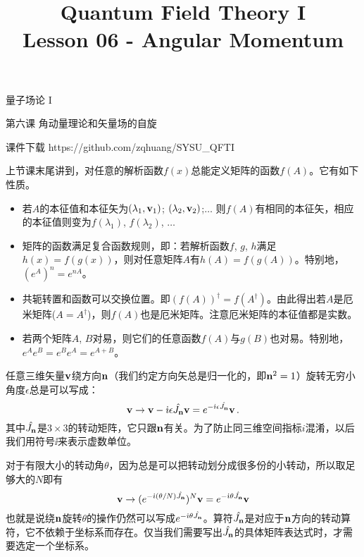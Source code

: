 \documentclass[CJK]{beamer}
\title{Quantum Field Theory I \\ Lesson 06 - Angular Momentum}
\author{}
\date{}
\begin{document}
\begin{frame}
 
\begin{center}
\begin{Large}
\bch
量子场论 I 

{\vskip 0.3in}

第六课 角动量理论和矢量场的自旋

\ech
\end{Large}
\end{center}

\vskip 0.2in

\bch
课件下载
\ech
https://github.com/zqhuang/SYSU\_QFTI

\end{frame}



\begin{frame}
\bch
上节课末尾讲到，对任意的解析函数$f(x)$总能定义矩阵的函数$f(A)$。它有如下性质。
\begin{itemize}
\item{若$A$的本征值和本征矢为$(\lambda_1, {\mathbf{v}}_1)$; $(\lambda_2, {\mathbf{v}}_2)$;$\ldots$ 则$f(A)$有相同的本征矢，相应的本征值则变为$f(\lambda_1)$, $f(\lambda_2)$, $\ldots$}
\item{矩阵的函数满足复合函数规则，即：若解析函数$f$, $g$, $h$满足$h(x) = f(g(x))$，则对任意矩阵$A$有$h(A)=f(g(A))$。特别地，$(e^A)^n = e^{nA}$。}
\item{共轭转置和函数可以交换位置。即$\left(f(A)\right)^\dagger = f(A^\dagger)$。由此得出若$A$是厄米矩阵($A=A^\dagger$)，则$f(A)$也是厄米矩阵。注意厄米矩阵的本征值都是实数。}
\item{若两个矩阵$A$, $B$对易，则它们的任意函数$f(A)$与$g(B)$也对易。特别地，$ e^{A}e^{B} = e^{B}e^{A}=e^{A+B}$。}
\end{itemize}

\ech
\end{frame}

\begin{frame}
\bch
任意三维矢量${\mathbf{v}}$绕方向${\mathbf{n}}$（我们约定方向矢总是归一化的，即${\mathbf{n}}^2=1$）旋转无穷小角度$\epsilon$总是可以写成：
$${\mathbf{v}} \rightarrow {\mathbf{v}} - {\dot{\imath}}\epsilon {\hat{J_{\mathbf{n}}}} {\mathbf{v}} = e^{-{\dot{\imath}}\epsilon{\hat{J_{\mathbf{n}}}}}{\mathbf{v}}\,.$$
其中${\hat{J_{\mathbf{n}}}}$是$3\times 3$的转动矩阵，它只跟${\mathbf{n}}$有关。为了防止同三维空间指标$i$混淆，以后我们用符号$\ii$来表示虚数单位。

对于有限大小的转动角$\theta$，因为总是可以把转动划分成很多份的小转动，所以取足够大的$N$即有
$${\mathbf{v}}\rightarrow (e^{-{\dot{\imath}}(\theta/N){\hat{J_{\mathbf{n}}}}})^N{\mathbf{v}} = e^{-{\dot{\imath}}\theta {\hat{J_{\mathbf{n}}}}}{\mathbf{v}}$$
也就是说绕${\mathbf{n}}$旋转$\theta$的操作仍然可以写成$e^{-{\dot{\imath}}\theta {\hat{J_{\mathbf{n}}}}}$。算符${\hat{J_{\mathbf{n}}}}$是对应于${\mathbf{n}}$方向的转动算符，它不依赖于坐标系而存在。仅当我们需要写出${\hat{J_{\mathbf{n}}}}$的具体矩阵表达式时，才需要选定一个坐标系。

\ech
\end{frame}
\end{document}

